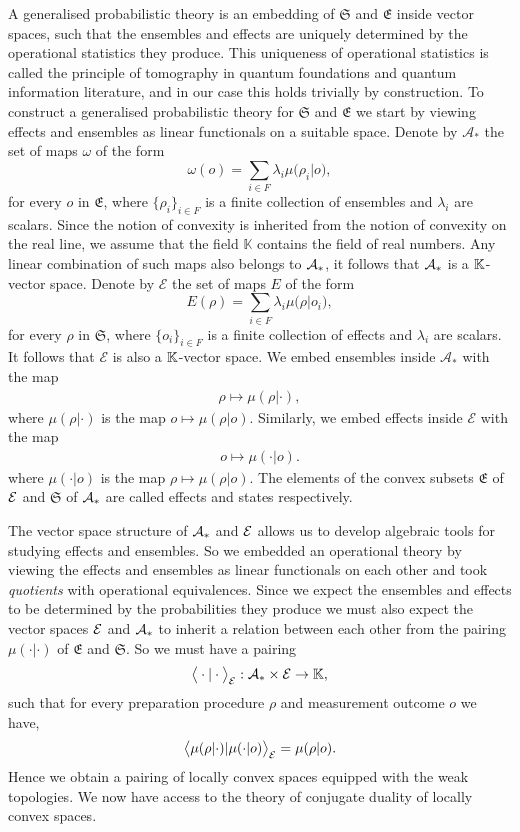 \documentclass[11pt]{article}
\begin{document}
A generalised probabilistic theory is an embedding of $\mathfrak{S}$ and $\mathfrak{E}$ inside vector spaces, such that the ensembles and effects are uniquely determined by the operational statistics they produce. This uniqueness of operational statistics is called the principle of tomography in quantum foundations and quantum information literature, and in our case this holds trivially by construction. To construct a generalised probabilistic theory for $\mathfrak{S}$ and $\mathfrak{E}$ we start by viewing effects and ensembles as linear functionals on a suitable space. Denote by $\mathcal{A}_*$ the set of maps $\omega$ of the form
$$\omega(o)=\textstyle\sum_{i\in F} \lambda_i \mu\big(\rho_i |o\big),$$
for every $o$ in $\mathfrak{E}$, where $\{\rho_i\}_{i\in F}$ is a finite collection of ensembles and $\lambda_i$ are scalars. Since the notion of convexity is inherited from the notion of convexity on the real line, we assume that the field $\mathbb{K}$ contains the field of real numbers. Any linear combination of such maps also belongs to $\mathcal{A}_* $, it follows that $\mathcal{A}_* $ is a $\mathbb{K}$-vector space. Denote by $\mathcal{E}$ the set of maps $E$ of the form
$$E(\rho)=\textstyle\sum_{i\in F}\lambda_i \mu\big(\rho | o_i\big),$$
for every $\rho$ in $\mathfrak{S}$, where $\{o_i\}_{i\in F}$ is a finite collection of effects and $\lambda_i$ are scalars. It follows that $\mathcal{E}$ is also a $\mathbb{K}$-vector space. We embed ensembles inside $\mathcal{A}_*$ with the map
\begin{align*}
	\rho \mapsto \mu(\rho|\cdot),
\end{align*}
where $\mu(\rho|\cdot)$ is the map $o \mapsto \mu(\rho|o)$. Similarly, we embed effects inside $\mathcal{E}$ with the map
\begin{align*}
	o \mapsto \mu(\cdot|o).
\end{align*}
where $\mu(\cdot|o)$ is the map $\rho\mapsto \mu(\rho|o)$. The elements of the convex subsets $\mathfrak{E}$ of $\mathcal{E}$ and $\mathfrak{S}$ of $\mathcal{A}_* $ are called effects and states respectively.

The vector space structure of $\mathcal{A}_* $ and $\mathcal{E}$ allows us to develop algebraic tools for studying effects and ensembles. So we embedded an operational theory by viewing the effects and ensembles as linear functionals on each other and took \emph{quotients} with operational equivalences. Since we expect the ensembles and effects to be determined by the probabilities they produce we must also expect the vector spaces $\mathcal{E}$ and $\mathcal{A}_* $ to inherit a relation between each other from the pairing $\mu(\cdot|\cdot)$ of $\mathfrak{E}$ and $\mathfrak{S}$. So we must have a pairing 
$$\big\langle\cdot|\cdot\big\rangle_{\mathcal{E}} : \mathcal{A}_*\times \mathcal{E}\to \mathbb{K},$$
such that for every preparation procedure $\rho$ and measurement outcome $o$ we have,
$$\big\langle \mu(\rho|\cdot)|\mu(\cdot|o)\big\rangle_{\mathcal{E}}=\mu(\rho|o).$$
Hence we obtain a pairing of locally convex spaces equipped with the weak topologies. We now have access to the theory of conjugate duality of locally convex spaces.
\end{document}
